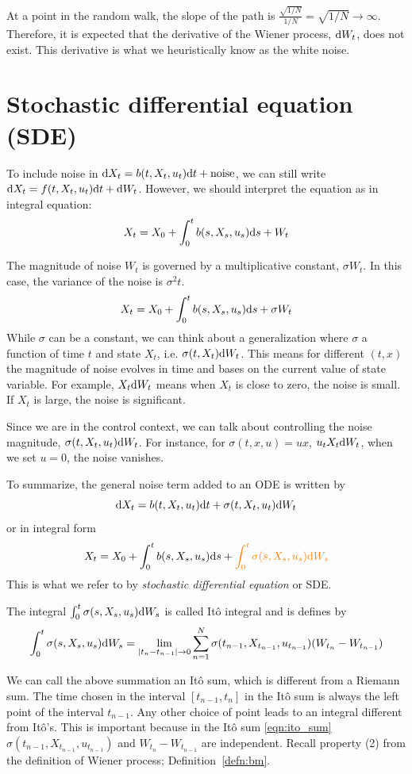 \documentclass[11pt]{book}
\newcommand{\dt}{\text{\normalfont d}t}
\newcommand{\ds}{\text{\normalfont d}s}
\newcommand{\dX}{\text{\normalfont d}X}
\newcommand{\dW}{\text{\normalfont d}W}
\begin{document}
At a point in the random walk, the slope of the path is $\frac{\sqrt{1/N}}{1/N}=\sqrt{1/N}\to\infty$. Therefore, it is expected that the derivative of the Wiener process, $\dW_t$, does not exist. This derivative is what we heuristically know as the white noise. 

\section{Stochastic differential equation (SDE)}
\label{sec:sde}
To include noise in $\dX_t=b(t,X_t,u_t)\dt+\text{noise}$, we can still write  $\dX_t=f(t,X_t,u_t)\dt+\dW_t$. However, we should interpret the equation as in integral equation:
\[
X_t=X_0+\int_0^t b(s,X_s,u_s)\ds+W_t
\]

The magnitude of noise $W_t$ is governed by a multiplicative constant, $\sigma W_t$. In this case, the variance of the noise is $\sigma^2 t$.   
\[
X_t=X_0+\int_0^t b(s,X_s,u_s)\ds+\sigma W_t
\]
While $\sigma$ can be a constant, we can think about a generalization where $\sigma$ a function of time $t$ and state $X_t$, i.e. $\sigma(t,X_t) \dW_t$. This means for different $(t,x)$ the magnitude of noise evolves in time and bases on the current value of state variable. For example, $X_t\dW_t$ means when $X_t$ is close to zero, the noise is small. If $X_t$ is large, the noise is significant. 

Since we are in the control context, we can talk about controlling the noise magnitude, $\sigma(t,X_t,u_t) \dW_t$. For instance, for $\sigma(t,x,u)=ux$, $u_tX_t\dW_t$, when we set $u=0$, the noise vanishes. 

To summarize, the general noise term added to an ODE is written by 
\[
\dX_t= b(t,X_t,u_t)\dt+\sigma(t,X_t,u_t)\dW_t
\]
or in integral form
\[
X_t=X_0+\int_0^t b(s,X_s,u_s)\ds+{\color{orange}\int_0^t \sigma(s,X_s,u_s)\dW_s}
\]
This is what we refer to by \emph{stochastic differential equation} or SDE.

The integral $\int_0^t \sigma(s,X_s,u_s)\dW_s$ is called Itô integral and is defines by
\begin{equation}
\label{eqn:ito_sum}
\int_0^t \sigma(s,X_s,u_s)\dW_s = \lim_{|t_n-t_{n-1}|\to0}\sum_{n=1}^{N} \sigma(t_{n-1},X_{t_{n-1}},u_{t_{n-1}})(W_{t_{n}}-W_{t_{n-1}})    
\end{equation}

We can call the above summation an Itô sum, which is different from a Riemann sum. The time chosen in the interval $[t_{n-1},t_{n}]$ in the Itô sum is always the left point of the interval $t_{n-1}$. Any other choice of point leads to an integral different from Itô's.  This is important because in the Itô sum \eqref{eqn:ito_sum} $\sigma(t_{n-1},X_{t_{n-1}},u_{t_{n-1}})$ and $W_{t_{n}}-W_{t_{n-1}}$ are independent. Recall property (2) from the definition of Wiener process; Definition~\ref{defn:bm}.
\end{document}
